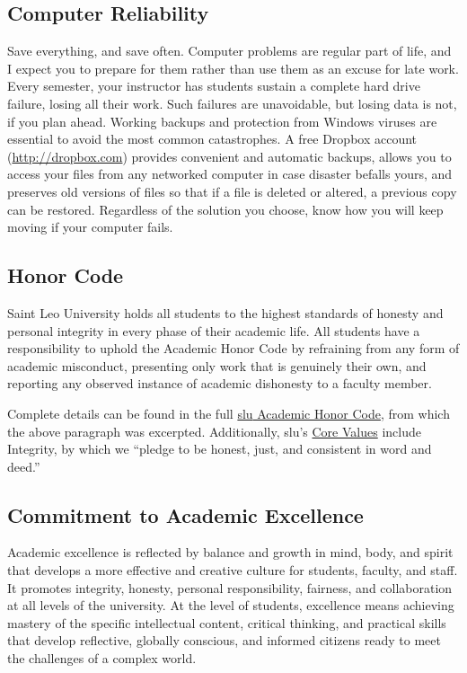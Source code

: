 \documentclass[12pt,oneside]{amsart}	%
\begin{document}
\subsection{Computer Reliability}\label{sub:reliability}
Save everything, and save often.  Computer problems are regular part of life, and I expect you to prepare for them rather than use them as an excuse for late work. Every semester, your instructor has students sustain a complete hard drive failure, losing all their work. Such failures are unavoidable, but losing data is not, if you plan ahead. Working backups and protection from Windows viruses are essential to avoid the most common catastrophes.  A free Dropbox account (\href{http://db.tt/mzWxY8s}{http://dropbox.com}) provides convenient and automatic backups, allows you to access your files from any networked computer in case disaster befalls yours, and preserves old versions of files so that if a file is deleted or altered, a previous copy can be restored. Regardless of the solution you choose, know how you will keep moving if your computer fails.

\subsection{Honor Code} %
\label{sub:honor_code}
Saint Leo University holds all students to the highest standards of honesty and personal integrity in every phase of their academic life. All students have a responsibility to uphold the Academic Honor Code by refraining from any form of academic misconduct, presenting only work that is genuinely their own, and reporting any observed instance of academic dishonesty to a faculty member.

Complete details can be found in the full \href{http://www.saintleo.edu/media/626793/academic_honor_code_policy.pdf}{\ac{slu} Academic Honor Code}, from which the above paragraph was excerpted. Additionally, \ac{slu}'s \href{http://www.saintleo.edu/about/florida-catholic-university.aspx}{Core Values} include Integrity, by which we ``pledge to be honest, just, and consistent in word and deed.''

\subsection{Commitment to Academic Excellence} %
\label{sub:commitment_to_academic_excellence}
Academic excellence is reflected by balance and growth in mind, body, and spirit that develops a more effective and creative culture for students, faculty, and staff. It promotes integrity, honesty, personal responsibility, fairness, and collaboration at all levels of the university. At the level of students, excellence means achieving mastery of the specific intellectual content, critical thinking, and practical skills that develop reflective, globally conscious, and informed citizens ready to meet the challenges of a complex world.
\end{document}
